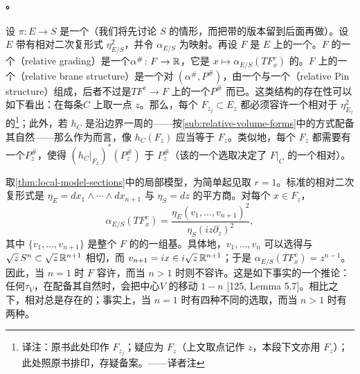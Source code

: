 \paragraph{\trRelative\trBraneStructure。}\label{sub:relative-brane-structures}
设 $\pi\colon E\to S$ 是一个\trLefschetzFibration（我们将先讨论 $S$ \trCompact{}的情形，而把带\trStriplikeEnd{}的版本留到后面再做）。设 $E$ 带有相对二次复\trVolume{}形式 $\eta^2_{E/S}$，并令 $\alpha_{E/S}$ 为\trRelative\trSquaredPhase{}映射。再设 $F$ 是 $E$ 上的一个\trLagrange\trBoundaryCondition。$F$ 的一个\textbf{\trRelative\trGrading}（relative grading）是一个\trLift{}$\alpha^{\#}\colon F\to\mathbb{R}$，它是 $x\mapsto\alpha_{E/S}(TF_x^v)$ 的\trLift。$F$ 上的一个\textbf{\trRelative\trBraneStructure}（relative brane structure）是一个对 $(\alpha^{\#},P^{\#})$，由一个\trRelative\trGrading{}与一个\textbf{\trRelative\trPinStructure}（relative Pin structure）组成，后者不过是\trVectorBundle{}$TF^v\to F$ 上的一个\trPinStructure{}$P^{\#}$ 而已。这类结构的存在性\trObstruction{}可以如下看出：在每条\trBoundaryCircle{}$C$ 上取一点 $z$。那么，每个 $F_{z_j}\subset E_z$ 都必须容许一个相对于 $\eta^2_{E_z}$ 的\trGrading\footnote{译注：原书此处印作 $F_{z_j}$；疑应为 $F_z$（上文取点记作 $z$，本段下文亦用 $F_z$）；此处照原书排印，存疑备案。——译者注}；此外，若 $h_C$ 是沿边界一周的\trMonodromy——按\cref{sub:relative-volume-forms}中的方式配备其自然\trGrading——那么作为\trGraded\trLagrange\trSubmanifold{}而言，像 $h_C(F_z)$ 应当等于 $F_z$。类似地，每个 $F_z$ 都需要有一个\trPinStructure{}$P_z^{\#}$，使得 $(h_C|_{F_z})^{*}(P_z^{\#})$ \trIsomorphic{}于 $P_z^{\#}$（该\trIsomorphism{}的一个选取决定了 $F|_C$ 的一个相对\trPinStructure）。
\begin{example}\label{thm:relative-brane-local-model}
取\cref{thm:local-model-sections}中的局部模型，为简单起见取 $r=1$。标准的相对二次复\trVolume{}形式是 $\eta_E=dx_1\wedge\cdots\wedge dx_{n+1}$ 与 $\eta_S=dz$ 的平方商。对每个 $x\in F_z$，
\begin{equation*}
\alpha_{E/S}(TF_x^v)=\frac{\eta_E(v_1,\ldots,v_{n+1})^2}{\eta_S(iz\partial_z)^2},
\end{equation*}
其中 $\{v_1,\ldots,v_{n+1}\}$ 是整个 $F$ 的\trTangentSpace{}的一组\trOrthonormal{}基。具体地，$v_1,\ldots,v_n$ 可以选得与 $\sqrt{z}\,S^n\subset\sqrt{z}\,\mathbb{R}^{n+1}$ 相切，而 $v_{n+1}=ix\in i\sqrt{z}\,\mathbb{R}^{n+1}$；于是 $\alpha_{E/S}(TF_x^v)=z^{n-1}$。因此，当 $n=1$ 时 $F$ 容许\trRelative\trGrading，而当 $n>1$ 时则不容许。这是如下事实的一个推论：任何\trDehnTwist{}$\tau_V$，在配备其自然\trGrading{}时，会把中心\trSphere{}$V$ 的\trGrading{}移动 $1-n$ [125, Lemma 5.7]。相比之下，相对\trPinStructure{}总是存在的；事实上，当 $n=1$ 时有四种不同的选取，而当 $n>1$ 时有两种。
\end{example}
